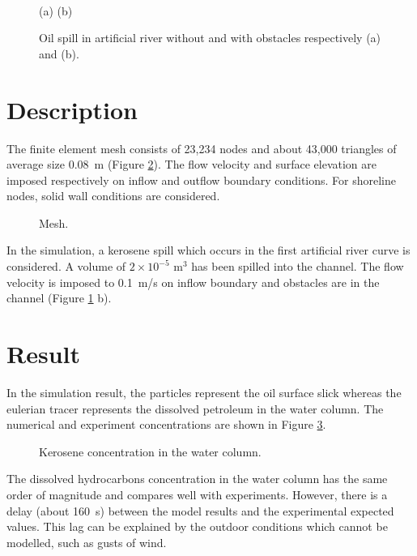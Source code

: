 \begin{figure}[htbp]
  \begin{center}
     \\
\begin{flushleft} \hspace{4.1cm} (a) \hspace{6cm} (b) \end{flushleft} 
  \end{center}
  \caption{Oil spill in artificial river without and with obstacles respectively (a) and (b).}
  \label{fig:obs_oil_spill_in_riv_art}
\end{figure}

\section{Description}

The finite element mesh consists of 23,234 nodes and about 43,000 triangles of
average size 0.08~m (Figure \ref{fig:riv_art_mesh}).
The flow velocity and surface elevation are imposed respectively on inflow and
outflow boundary conditions.
For shoreline nodes, solid wall conditions are considered.

\begin{figure}[h]
\begin{center}
\end{center}
\caption{Mesh.}
\label{fig:riv_art_mesh}
\end{figure}

In the simulation, a kerosene spill which occurs in the first artificial river
curve is considered.
A volume of $2\times 10^{-5}$ m$^3$ has been spilled into the channel.
The flow velocity is imposed to 0.1~m/s on inflow boundary and obstacles are in
the channel (Figure \ref{fig:obs_oil_spill_in_riv_art} b).

\section{Result}

In the simulation result, the particles represent the oil surface slick whereas
the eulerian tracer represents the dissolved petroleum in the water column.
The numerical and experiment concentrations are shown in Figure
\ref{fig:riv_art_simu}.

\begin{figure}[h]
\begin{center}
\end{center}
\caption{Kerosene concentration in the water column.}
\label{fig:riv_art_simu}
\end{figure}

The dissolved hydrocarbons concentration in the water column has the same order
of magnitude and compares well with experiments.
However, there is a delay (about 160~s) between the model results and the
experimental expected values.
This lag can be explained by the outdoor conditions which cannot be modelled,
such as gusts of wind.

